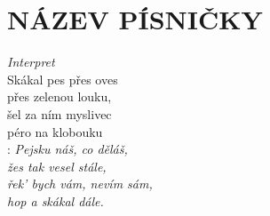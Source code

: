 \section*{\Huge NÁZEV PÍSNIČKY}
\emph{Interpret}\\

Skákal pes přes oves \\
přes zelenou louku, \\
šel za ním myslivec \\
péro na klobouku \\

\textregistered:
\emph{
Pejsku náš, co děláš,\\
žes tak vesel stále, \\
řek' bych vám, nevím sám,\\
hop a skákal dále.}

\newpage
